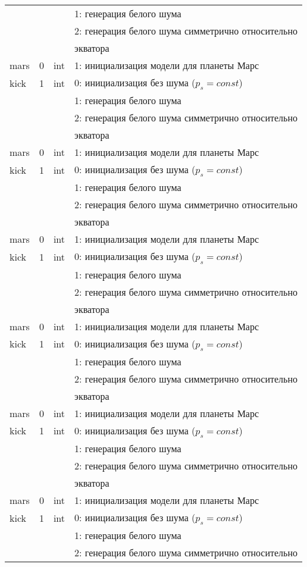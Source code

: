 \begin{refsection}
\begin{longtable}[c]{|l|c|l|l|}
	&   &     & 1: генерация белого шума                  \\
	&   &     & 2: генерация белого шума симметрично относительно \\
		& & & экватора    \\
	mars & 0 & int & 1: инициализация модели для планеты Марс     \\
	kick & 1 & int & 0: инициализация без шума ($p_s = const$) \\
	&   &     & 1: генерация белого шума                  \\
	&   &     & 2: генерация белого шума симметрично относительно \\
		& & & экватора    \\
	mars & 0 & int & 1: инициализация модели для планеты Марс     \\
	kick & 1 & int & 0: инициализация без шума ($p_s = const$) \\
	&   &     & 1: генерация белого шума                  \\
	&   &     & 2: генерация белого шума симметрично относительно \\
		& & & экватора    \\
	mars & 0 & int & 1: инициализация модели для планеты Марс     \\
	kick & 1 & int & 0: инициализация без шума ($p_s = const$) \\
	&   &     & 1: генерация белого шума                  \\
	&   &     & 2: генерация белого шума симметрично относительно \\
		& & & экватора    \\
	mars & 0 & int & 1: инициализация модели для планеты Марс     \\
	kick & 1 & int & 0: инициализация без шума ($p_s = const$) \\
	&   &     & 1: генерация белого шума                  \\
	&   &     & 2: генерация белого шума симметрично относительно \\
		& & & экватора    \\
	mars & 0 & int & 1: инициализация модели для планеты Марс     \\
	kick & 1 & int & 0: инициализация без шума ($p_s = const$) \\
	&   &     & 1: генерация белого шума                  \\
	&   &     & 2: генерация белого шума симметрично относительно \\
		& & & экватора    \\
	mars & 0 & int & 1: инициализация модели для планеты Марс     \\
	kick & 1 & int & 0: инициализация без шума ($p_s = const$) \\
	&   &     & 1: генерация белого шума                  \\
	&   &     & 2: генерация белого шума симметрично относительно \\
\end{longtable}
\normalsize%
\endgroup
\normalsize%



\end{refsection}

